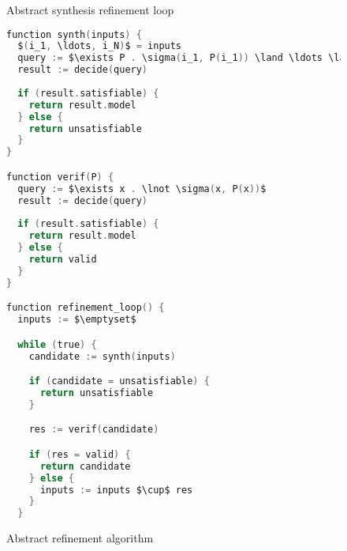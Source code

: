 \documentclass[a4paper]{llncs}
\begin{document}
\begin{figure}
 \centering

 \label{fig:abstract-refinement}
 \caption{Abstract synthesis refinement loop}
\end{figure}

\begin{figure}
\centering
\begin{minipage}{0.9\textwidth}
 \begin{lstlisting}[mathescape,language=C,morekeywords={function}]
function synth(inputs) {
  $(i_1, \ldots, i_N)$ = inputs
  query := $\exists P . \sigma(i_1, P(i_1)) \land \ldots \land \sigma(i_N, P(i_N))$
  result := decide(query)
  
  if (result.satisfiable) {
    return result.model
  } else {
    return unsatisfiable
  }
}

function verif(P) {
  query := $\exists x . \lnot \sigma(x, P(x))$
  result := decide(query)
  
  if (result.satisfiable) {
    return result.model
  } else {
    return valid
  }
}

function refinement_loop() {
  inputs := $\emptyset$

  while (true) {
    candidate := synth(inputs)

    if (candidate = unsatisfiable) {
      return unsatisfiable
    }

    res := verif(candidate)

    if (res = valid) {
      return candidate
    } else {
      inputs := inputs $\cup$ res
    }
  }
 \end{lstlisting}
 \end{minipage}

 \label{fig:abstract-refinement-code}
 \caption{Abstract refinement algorithm}
\end{figure}
\end{document}
